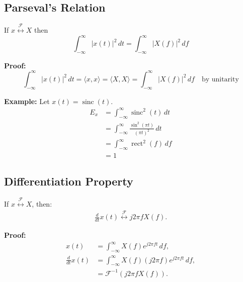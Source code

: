 \subsection{Parseval's Relation}
\begin{definition}
    If \( x \overset{\mathcal{F}}{\leftrightarrow} X \) then
    \[
    \int_{-\infty}^{\infty} |x(t)|^2 \, dt = \int_{-\infty}^{\infty} |X(f)|^2 \, df
    \]
\end{definition}

\begin{derivation}
    \textbf{Proof:}
    \[
    \int_{-\infty}^{\infty} |x(t)|^2 \, dt = \langle x, x \rangle = \langle X, X \rangle = \int_{-\infty}^{\infty} |X(f)|^2 \, df \quad \text{by unitarity}
    \]
\end{derivation}

\begin{example}
    \textbf{Example:}
    Let \( x(t) = \operatorname{sinc}(t) \).
    \begin{align*}
        E_x &= \int_{-\infty}^{\infty} \operatorname{sinc}^2(t) \, dt \\ 
        &= \int_{-\infty}^{\infty} \frac{\sin^2(\pi t)}{(\pi t)^2} \, dt \\
        &= \int_{-\infty}^{\infty} \operatorname{rect}^2(f) \, df \\
        &= 1
    \end{align*}
\end{example}

\subsection{Differentiation Property}
\begin{definition}
    If \( x \overset{\mathcal{F}}{\leftrightarrow} X \), then:
    \begin{align*}
    \frac{d}{dt} x(t) \overset{\mathcal{F}}{\leftrightarrow} j2\pi f X(f).
    \end{align*}
\end{definition}

\begin{derivation}
    \textbf{Proof:}
    \begin{align*}
    x(t) &= \int_{-\infty}^{\infty} X(f) e^{j 2 \pi f t} \, df, \\
    \frac{d}{dt} x(t) &= \int_{-\infty}^{\infty} X(f) \left( j 2 \pi f \right) e^{j 2 \pi f t} \, df, \\
    &= \mathcal{F}^{-1} \left( j 2 \pi f X(f) \right).
    \end{align*}
\end{derivation}

